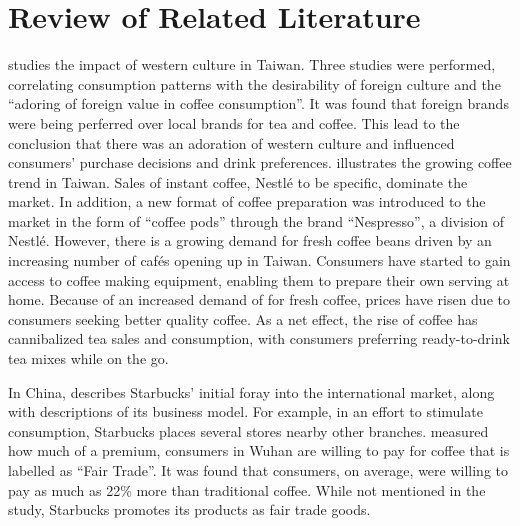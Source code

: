 \section{Review of Related Literature}

\autocite{su_impact_2006} studies the impact of western culture in Taiwan. Three
studies were performed, correlating consumption patterns with the desirability
of foreign culture and the ``adoring of foreign value in coffee consumption''.
It was found that foreign brands were being perferred over local brands for tea
and coffee. This lead to the conclusion that there was an adoration of western
culture and influenced consumers' purchase decisions and drink preferences.
\autocite{euromonitor_international_coffee_2015} illustrates the growing coffee
trend in Taiwan. Sales of instant coffee, Nestlé to be specific, dominate the
market. In addition, a new format of coffee preparation was introduced to the
market in the form of ``coffee pods'' through the brand ``Nespresso'', a
division of Nestlé. However, there is a growing demand for fresh coffee beans
driven by an increasing number of cafés opening up in Taiwan. Consumers have
started to gain access to coffee making equipment, enabling them to prepare
their own serving at home. Because of an increased demand of for fresh coffee,
prices have risen due to consumers seeking better quality coffee. As a net
effect, the rise of coffee has cannibalized tea sales and consumption, with
consumers preferring ready-to-drink tea mixes while on the go.

In China, \autocite{harrison_exporting_2005} describes Starbucks' initial foray
into the international market, along with descriptions of its business model.
For example, in an effort to stimulate consumption, Starbucks places several
stores nearby other branches. \autocite{yang_consumer_2012} measured how much of
a premium, consumers in Wuhan are willing to pay for coffee that is labelled as
``Fair Trade''. It was found that consumers, on average, were willing to pay as
much as 22\% more than traditional coffee. While not mentioned in the study,
Starbucks promotes its products as fair trade goods.
